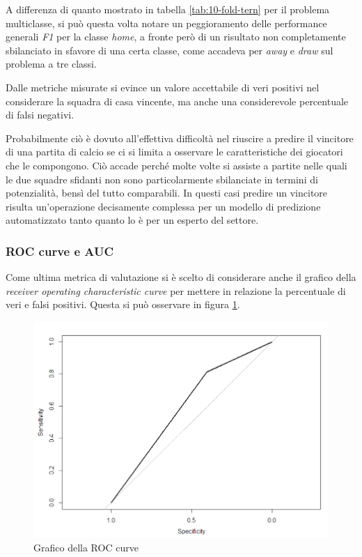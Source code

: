 \documentclass[hidelinks, 12pt]{article}
\begin{document}
A differenza di quanto mostrato in tabella \ref{tab:10-fold-tern} per il problema multiclasse, si può questa volta notare un peggioramento delle performance generali \textit{F1} per la classe \textit{home}, a fronte però di un risultato non completamente sbilanciato in sfavore di una certa classe, come accadeva per \textit{away} e \textit{draw} sul problema a tre classi.

Dalle metriche misurate si evince un valore accettabile di veri positivi nel considerare la squadra di casa vincente, ma anche una considerevole percentuale di falsi negativi.

Probabilmente ciò è dovuto all'effettiva difficoltà nel riuscire a predire il vincitore di una partita di calcio se ci si limita a osservare le caratteristiche dei giocatori che le compongono. Ciò accade perché molte volte si assiste a partite nelle quali le due squadre sfidanti non sono particolarmente sbilanciate in termini di potenzialità, bensì del tutto comparabili. In questi casi predire un vincitore risulta un'operazione decisamente complessa per un modello di predizione automatizzato tanto quanto lo è per un esperto del settore.


\clearpage
\subsubsection{ROC curve e AUC}

Come ultima metrica di valutazione si è scelto di considerare anche il grafico della \textit{receiver operating characteristic curve} per mettere in relazione la percentuale di veri e falsi positivi. Questa si può osservare in figura \ref{fig:perf-roc}.

\begin{figure}[H]
	\centering
	\includegraphics[scale=0.6]{images/06_roc.png}
	\caption[Grafico della ROC curve]{Grafico della ROC curve}
	\label{fig:perf-roc}
\end{figure}
\end{document}
